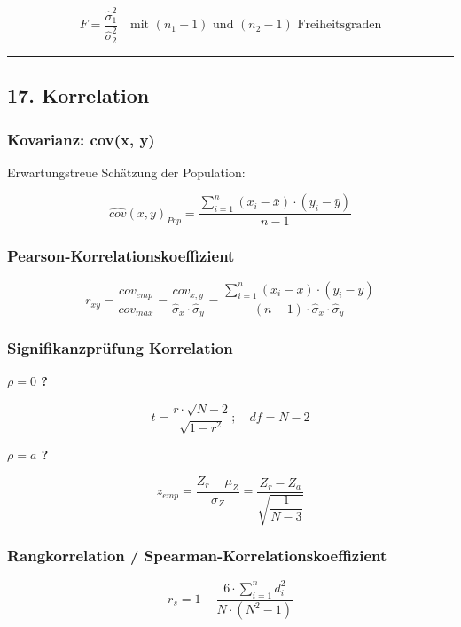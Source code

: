 \documentclass[
]{article}
\begin{document}
\[F = \frac{\hat{\sigma}_1^2}{\hat{\sigma}_2^2} \quad \text{mit } (n_1 - 1) \text{ und } (n_2 - 1) \text{ Freiheitsgraden}\]

\begin{center}\rule{0.5\linewidth}{0.5pt}\end{center}

\subsection{17. Korrelation}\label{korrelation}

\subsubsection{Kovarianz: cov(x, y)}\label{kovarianz-covx-y}

Erwartungstreue Schätzung der Population:

\[\widehat{cov}(x, y)_{Pop} = \frac{\sum_{i=1}^{n}(x_i - \bar{x}) \cdot (y_i - \bar{y})}{n - 1}\]

\subsubsection{Pearson-Korrelationskoeffizient}\label{pearson-korrelationskoeffizient}

\[r_{xy} = \frac{cov_{emp}}{cov_{max}} = \frac{cov_{x,y}}{\hat{\sigma}_x \cdot \hat{\sigma}_y} = \frac{\sum_{i=1}^{n}(x_i - \bar{x}) \cdot (y_i - \bar{y})}{(n - 1) \cdot \hat{\sigma}_x \cdot \hat{\sigma}_y}\]

\subsubsection{Signifikanzprüfung
Korrelation}\label{signifikanzpruxfcfung-korrelation}

\textbf{\(\rho = 0\) ?}

\[t = \frac{r \cdot \sqrt{N - 2}}{\sqrt{1 - r^2}}; \quad df = N - 2\]

\textbf{\(\rho = a\) ?}

\[z_{emp} = \frac{Z_r - \mu_Z}{\sigma_Z} = \frac{Z_r - Z_a}{\sqrt{\dfrac{1}{N - 3}}}\]

\subsubsection{Rangkorrelation /
Spearman-Korrelationskoeffizient}\label{rangkorrelation-spearman-korrelationskoeffizient}

\[r_s = 1 - \frac{6 \cdot \sum_{i=1}^{n} d_i^2}{N \cdot (N^2 - 1)}\]
\end{document}
